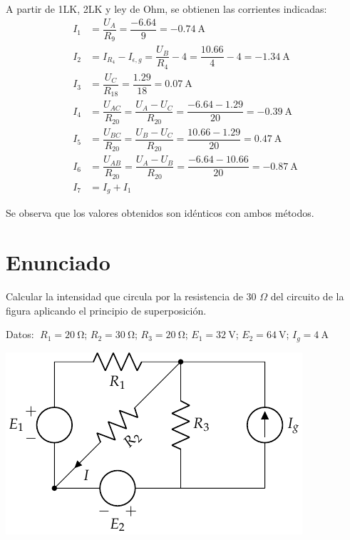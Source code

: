      A partir de 1LK, 2LK y ley de Ohm, se obtienen las corrientes
     indicadas:
     \begin{align*}
       I_1&=\dfrac{U_A}{R_9}=\dfrac{-6.64}{9}=\qty{-0.74}{\ampere}\\[7pt]
       I_2&= I_{R_4}-I_{\epsilon,g}=\dfrac{U_B}{R_4}-4=\dfrac{10.66}{4}-4=\qty{-1.34}{\ampere}\\[7pt]
       I_3&=\dfrac{U_C}{R_{18}}=\dfrac{1.29}{18}=\qty{0.07}{\ampere}\\[7pt]
       I_4&=\dfrac{U_{AC}}{R_{20}}=\dfrac{U_A-U_C}{R_{20}}=\dfrac{-6.64-1.29}{20}=\qty{-0.39}{\ampere}\\[7pt]
       I_5&=\dfrac{U_{BC}}{R_{20}}=\dfrac{U_B-U_C}{R_{20}}=\dfrac{10.66-1.29}{20}=\qty{0.47}{\ampere}\\[7pt]
       I_6&=\dfrac{U_{AB}}{R_{20}}=\dfrac{U_A-U_B}{R_{20}}=\dfrac{-6.64-10.66}{20}=\qty{-0.87}{\ampere}\\[7pt]
       I_7&=I_g+I_1
     \end{align*}

     Se observa que los valores obtenidos son idénticos con ambos
     métodos.
     \section{Enunciado}
     Calcular la intensidad que circula por la resistencia de 30
     $\Omega$ del circuito de la figura aplicando el principio de
     superposición.

  \vspace{2mm}   
  Datos: $\; R_1 = \qty{20}{\ohm}$;\; $R_2 = \qty{30}{\ohm}$;\; $R_3 = \qty{20}{\ohm}$;\; $E_1 = \qty{32}{\volt}$;\; $E_2 = \qty{64}{\volt}$;\; $I_g = \qty{4}{\ampere}$
  
\begin{center}
  \includegraphics{figuras/BT1_16.pdf}
\end{center}


